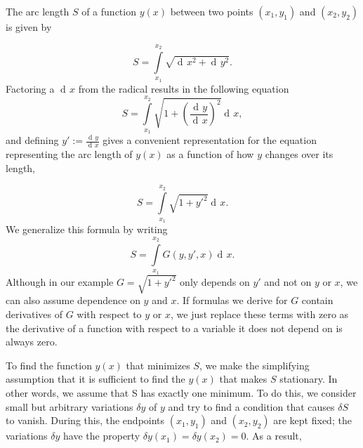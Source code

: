 \documentclass[prb,preprint]{revtex4-1}
\DeclareMathOperator{\dd}{d\!}
\begin{document}
The arc length $S$ of a function $y(x)$ between two points $(x_1,y_1)$ and $(x_2,y_2)$ is given by

\begin{equation}
S=\int\limits_{x_1}^{x_2}\sqrt{\dd x^2 + \dd y^2}.
\end{equation}
Factoring a $\dd x$ from the radical results in the following equation
\begin{equation}
S= \int\limits_{x_1}^{x_2}\sqrt{1 + \left(\frac{\dd y}{\dd x}\right)^2} \dd x,
\end{equation}
and defining $y' := \frac{\dd y}{\dd x}$ gives a convenient representation for the equation representing the arc length of $y(x)$ as a function of how $y$ changes over its length, %

\begin{equation}
S = \int\limits_{x_1}^{x_2}\sqrt{1 + y'^2} \dd x.
\end{equation}
We generalize this formula by writing
\begin{equation}
S=\int\limits_{x_1}^{x_2} G(y,y',x) \dd x .
\end{equation}
Although in our example $G = \sqrt{1 + y'^2}$ only depends on $y'$ and not on $y$ or $x$, we can also assume dependence on $y$ and $x$. %
If formulas we derive for $G$ contain derivatives of $G$ with respect to $y$ or $x$, we just replace these terms with zero as the derivative of a function with respect to a variable it does not depend on is always zero.


To find the function $y(x)$ that minimizes $S$, we make the simplifying assumption that it is sufficient to find the $y(x)$ that makes $S$ stationary. In other words, we assume that S has exactly one minimum.
To do this, we consider small but arbitrary variations $\delta y$ of $y$ and try to find a condition that causes $\delta S$ to vanish. 
During this, the endpoints $(x_1,y_1)$ and $(x_2,y_2)$ are kept fixed; the variations $\delta y$ have the property $\delta y(x_1) = \delta y(x_2) = 0$. 
As a result,
\end{document}
